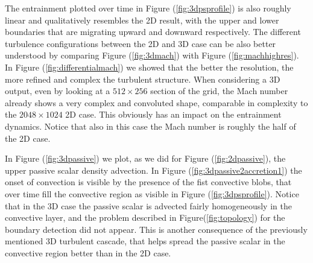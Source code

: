 The entrainment plotted over time in Figure (\ref{fig:3dpsprofile}) is also roughly linear and qualitatively resembles the 2D result, with the upper and lower boundaries that are migrating upward and downward respectively.
The different turbulence configurations between the 2D and 3D case can be also better understood by comparing Figure (\ref{fig:3dmach}) with Figure (\ref{fig:machhighres}). In Figure (\ref{fig:differentialmach}) we showed that the better the resolution, the more refined and complex the turbulent structure. When considering a 3D output, even by looking at a $512 \times 256$ section of the grid, the Mach number already shows a very complex and convoluted shape, comparable in complexity to the $2048 \times 1024$ 2D case. This obviously has an impact on the entrainment dynamics. Notice that also in this case the Mach number is roughly the half of the 2D case. 


In Figure (\ref{fig:3dpassive}) we plot, as we did for Figure (\ref{fig:2dpassive}), the upper passive scalar density advection. In Figure (\ref{fig:3dpassive2accretion1}) the onset of convection is visible by the presence of the fist convective blobs, that over time fill the convective region as visible in Figure (\ref{fig:3dpsprofile}). Notice that in the 3D case the passive scalar is advected fairly homogeneously in the convective layer, and the problem described in Figure(\ref{fig:topology}) for the boundary detection did not appear. This is another consequence of the previously mentioned 3D turbulent cascade, that helps spread the passive scalar in the convective region better than in the 2D case.


